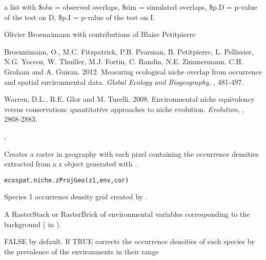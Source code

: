 \documentclass[a4paper]{book}
\begin{document}
%
\begin{Value}
a list with \$obs = observed overlaps, \$sim = simulated overlaps, \$p.D = p-value of the test on D, \$p.I = p-value of the test on I.
\end{Value}
%
\begin{Author}\relax
Olivier Broennimann  with contributions of Blaise Petitpierre 
\end{Author}
%
\begin{References}\relax
Broennimann, O., M.C. Fitzpatrick, P.B. Pearman, B. Petitpierre, L. Pellissier, N.G. Yoccoz, W. Thuiller, M.J. Fortin, C. Randin, N.E. Zimmermann, C.H. Graham and A. Guisan. 2012. Measuring ecological niche overlap from occurrence and spatial environmental data. \emph{Global Ecology and Biogeography}, , 481-497.

Warren, D.L., R.E. Glor and M. Turelli. 2008. Environmental niche equivalency versus conservatism: quantitative approaches to niche evolution. \emph{Evolution}, , 2868-2883.
\end{References}
%
\begin{SeeAlso}\relax
{}, 
\end{SeeAlso}
%
\begin{Description}\relax
Creates a raster in geography with each pixel containing the occurrence densities extracted from a z object generated with .
\end{Description}
%
\begin{Usage}
\begin{verbatim}
ecospat.niche.zProjGeo(z1,env,cor)
\end{verbatim}
\end{Usage}
%
\begin{Arguments}
\begin{ldescription}
\item[\code{z1}] Species 1 occurrence density grid created by .
\item[\code{env}] A RasterStack or RasterBrick of environmental variables corresponding to the background ( in ).
\item[\code{cor}] FALSE by default. If TRUE corrects the occurrence densities of each species by the prevalence of the environments in their range
\end{ldescription}
\end{Arguments}
\end{document}
